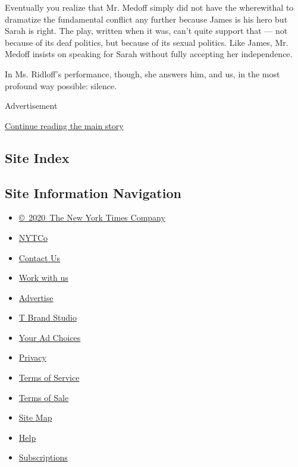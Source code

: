 Eventually you realize that Mr. Medoff simply did not have the
wherewithal to dramatize the fundamental conflict any further because
James is his hero but Sarah is right. The play, written when it was,
can't quite support that --- not because of its deaf politics, but
because of its sexual politics. Like James, Mr. Medoff insists on
speaking for Sarah without fully accepting her independence.

In Ms. Ridloff's performance, though, she answers him, and us, in the
most profound way possible: silence.

Advertisement

\protect\hyperlink{after-bottom}{Continue reading the main story}

\hypertarget{site-index}{%
\subsection{Site Index}\label{site-index}}

\hypertarget{site-information-navigation}{%
\subsection{Site Information
Navigation}\label{site-information-navigation}}

\begin{itemize}
\tightlist
\item
  \href{https://help.nytimes3xbfgragh.onion/hc/en-us/articles/115014792127-Copyright-notice}{©~2020~The
  New York Times Company}
\end{itemize}

\begin{itemize}
\tightlist
\item
  \href{https://www.nytco.com/}{NYTCo}
\item
  \href{https://help.nytimes3xbfgragh.onion/hc/en-us/articles/115015385887-Contact-Us}{Contact
  Us}
\item
  \href{https://www.nytco.com/careers/}{Work with us}
\item
  \href{https://nytmediakit.com/}{Advertise}
\item
  \href{http://www.tbrandstudio.com/}{T Brand Studio}
\item
  \href{https://www.nytimes3xbfgragh.onion/privacy/cookie-policy\#how-do-i-manage-trackers}{Your
  Ad Choices}
\item
  \href{https://www.nytimes3xbfgragh.onion/privacy}{Privacy}
\item
  \href{https://help.nytimes3xbfgragh.onion/hc/en-us/articles/115014893428-Terms-of-service}{Terms
  of Service}
\item
  \href{https://help.nytimes3xbfgragh.onion/hc/en-us/articles/115014893968-Terms-of-sale}{Terms
  of Sale}
\item
  \href{https://spiderbites.nytimes3xbfgragh.onion}{Site Map}
\item
  \href{https://help.nytimes3xbfgragh.onion/hc/en-us}{Help}
\item
  \href{https://www.nytimes3xbfgragh.onion/subscription?campaignId=37WXW}{Subscriptions}
\end{itemize}
